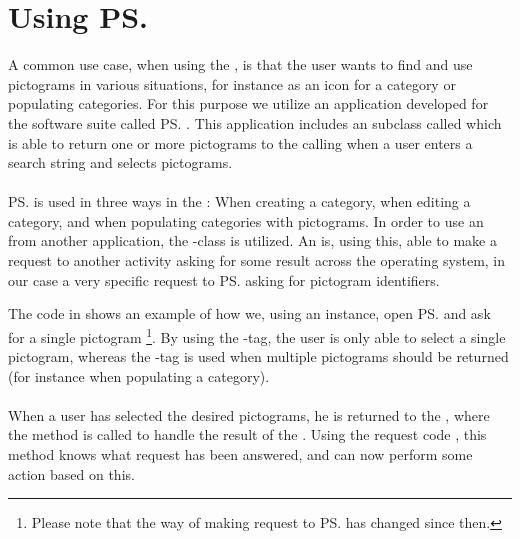 
\section{Using \ps}
\label{sec:using_pictosearch}

A common use case, when using the \ct, is that the user wants to find and use pictograms in various situations, for instance as an icon for a category or populating categories. For this purpose we utilize an application developed for the \giraf software suite called \ps. This application includes an  subclass called  which is able to return one or more pictograms to the calling  when a user enters a search string and selects pictograms. 
\\\\
\ps is used in three ways in the \ct: When creating a category, when editing a category, and when populating categories with pictograms. In order to use an  from another application, the -class is utilized. An  is, using this, able to make a request to another activity asking for some result across the operating system, in our case a very specific request to \ps asking for pictogram identifiers. 



The code in  shows an example of how we, using an  instance, open \ps and ask for a single pictogram \footnote{Please note that the way of making request to \ps has changed since then.}. By using the -tag, the user is only able to select a single pictogram, whereas the -tag is used when multiple pictograms should be returned (for instance when populating a category). 
\\\\
When a user has selected the desired pictograms, he is returned to the \ct, where the  method is called to handle the result of the . Using the request code , this method knows what request has been answered, and can now perform some action based on this.